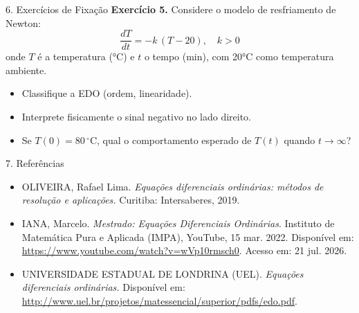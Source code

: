 \documentclass[11pt, aspectratio=169, xcolor=table]{beamer}
\begin{document}
\begin{frame}{6. Exercícios de Fixação}
\vspace{0.3cm}
\textbf{Exercício 5.} Considere o modelo de resfriamento de Newton:
\[
\frac{dT}{dt} = -k\,(T - 20), \quad k > 0
\]
onde $T$ é a temperatura (°C) e $t$ o tempo (min), com 20°C como temperatura ambiente.
\begin{itemize}
  \item[a)] Classifique a EDO (ordem, linearidade).
  \item[b)] Interprete fisicamente o sinal negativo no lado direito.
  \item[c)] Se $T(0) = 80\,^\circ\text{C}$, qual o comportamento esperado de $T(t)$ quando $t \to \infty$?
\end{itemize}
\end{frame}

\begin{frame}{7. Referências}
\small
\begin{itemize}
  \item OLIVEIRA, Rafael Lima. \textit{Equações diferenciais ordinárias: métodos de resolução e aplicações.} Curitiba: Intersaberes, 2019.
  \item IANA, Marcelo. \textit{Mestrado: Equações Diferenciais Ordinárias}. Instituto de Matemática Pura e Aplicada (IMPA), YouTube, 15 mar. 2022.  Disponível em: \url{https://www.youtube.com/watch?v=wVp10rmsch0}.  Acesso em: 21 jul. 2026.
  \item UNIVERSIDADE ESTADUAL DE LONDRINA (UEL). \textit{Equações diferenciais ordinárias.} Disponível em: \url{http://www.uel.br/projetos/matessencial/superior/pdfs/edo.pdf}.
\end{itemize}
\end{frame}
\end{document}
